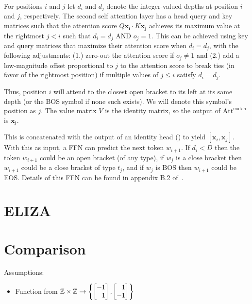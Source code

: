 For positions $i$ and $j$ let $d_i$ and $d_j$ denote the integer-valued depths at position $i$ and $j$, respectively. The second self attention layer has a head query and key matrices such that the attention score $Q\mathbf{x_i} \cdot K\mathbf{x_j}$ achieves its maximum value at the rightmost $j < i$ such that $d_i=d_j$ AND $o_j=1$. This can be achieved using key and query matrices that maximize their attention score when $d_i=d_j$, with the following adjustments: (1.) zero-out the attention score if $o_j \neq 1$ and (2.) add a low-magnitude offset proportional to $j$ to the attention score to break ties (in favor of the rightmost position) if multiple values of $j \le i$ satisfy $d_i=d_j$.

Thus, position $i$ will attend to the closest open bracket to its left at its same depth (or the BOS symbol if none such exists). We will denote this symbol's position as $j$. The value matrix $V$ is the identity matrix, so the output of $\mathrm{Att}^{\mathrm{match}}$ is $\mathbf{x_j}$.

This is concatenated with the output of an identity head () to yield $[\mathbf{x}_i, \mathbf{x}_j]$. With this as input, a FFN can predict the next token $w_{i+1}$. If $d_i < D$ then the token $w_{i+1}$ could be an open bracket (of any type), if $w_{j}$ is a close bracket then $w_{i+1}$ could be a close bracket of type $t_j$, and if $w_j$ is BOS then $w_{i+1}$ could be EOS. Details of this FFN can be found in appendix B.2 of~\citet{yao-2021-self-attention}.

\section{ELIZA}


\section{Comparison}
\label{sec:assembly_comparison}


Assumptions:
\begin{itemize}
    \item Function from $\Z\times\Z\to \left\{\begin{bmatrix}
                  -1 \\\phantom- 1
              \end{bmatrix}, \begin{bmatrix}
                  \phantom- 1 \\-1
              \end{bmatrix}\right\}$
\end{itemize}

